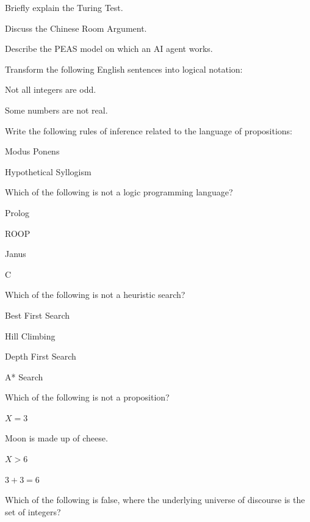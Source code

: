 \documentclass[11pt,a4paper]{article}
\begin{document}
\begin{parts}
  \item Briefly explain the Turing Test.
  \item Discuss the Chinese Room Argument.
  \item Describe the PEAS model on which an AI agent works.
  \item Transform the following English sentences into logical notation:
  
\begin{parts}
    \item Not all integers are odd.
    \item Some numbers are not real.
  \end{parts}
  \item Write the following rules of inference related to the language of propositions:
  
\begin{parts}
    \item Modus Ponens
    \item Hypothetical Syllogism
  \end{parts}
  \item Which of the following is not a logic programming language?
  
\begin{parts}
    \item Prolog
    \item ROOP
    \item Janus
    \item C
  \end{parts}
  \item Which of the following is not a heuristic search?
  
\begin{parts}
    \item Best First Search
    \item Hill Climbing
    \item Depth First Search
    \item A* Search
  \end{parts}
  \item Which of the following is not a proposition?
  
\begin{parts}
    \item $X = 3$
    \item Moon is made up of cheese.
    \item $X > 6$
    \item $3 + 3 = 6$
  \end{parts}
  \item Which of the following is false, where the underlying universe of discourse is the set of integers?
  

\end{parts}
\end{document}
